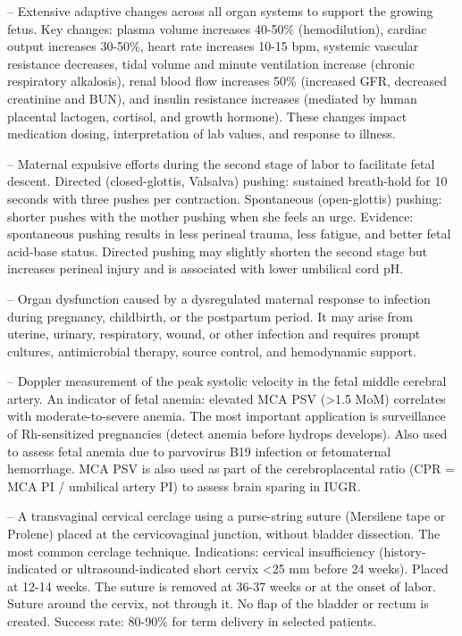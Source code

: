 -- Extensive adaptive changes across all organ systems to support the growing fetus. Key changes: plasma volume increases 40-50\% (hemodilution), cardiac output increases 30-50\%, heart rate increases 10-15 bpm, systemic vascular resistance decreases, tidal volume and minute ventilation increase (chronic respiratory alkalosis), renal blood flow increases 50\% (increased GFR, decreased creatinine and BUN), and insulin resistance increases (mediated by human placental lactogen, cortisol, and growth hormone). These changes impact medication dosing, interpretation of lab values, and response to illness.

-- Maternal expulsive efforts during the second stage of labor to facilitate fetal descent. Directed (closed-glottis, Valsalva) pushing: sustained breath-hold for 10 seconds with three pushes per contraction. Spontaneous (open-glottis) pushing: shorter pushes with the mother pushing when she feels an urge. Evidence: spontaneous pushing results in less perineal trauma, less fatigue, and better fetal acid-base status. Directed pushing may slightly shorten the second stage but increases perineal injury and is associated with lower umbilical cord pH.

-- Organ dysfunction caused by a dysregulated maternal response to infection during pregnancy, childbirth, or the postpartum period. It may arise from uterine, urinary, respiratory, wound, or other infection and requires prompt cultures, antimicrobial therapy, source control, and hemodynamic support.

-- Doppler measurement of the peak systolic velocity in the fetal middle cerebral artery. An indicator of fetal anemia: elevated MCA PSV (>1.5 MoM) correlates with moderate-to-severe anemia. The most important application is surveillance of Rh-sensitized pregnancies (detect anemia before hydrops develops). Also used to assess fetal anemia due to parvovirus B19 infection or fetomaternal hemorrhage. MCA PSV is also used as part of the cerebroplacental ratio (CPR = MCA PI / umbilical artery PI) to assess brain sparing in IUGR.

-- A transvaginal cervical cerclage using a purse-string suture (Mersilene tape or Prolene) placed at the cervicovaginal junction, without bladder dissection. The most common cerclage technique. Indications: cervical insufficiency (history-indicated or ultrasound-indicated short cervix <25 mm before 24 weeks). Placed at 12-14 weeks. The suture is removed at 36-37 weeks or at the onset of labor. Suture around the cervix, not through it. No flap of the bladder or rectum is created. Success rate: 80-90\% for term delivery in selected patients.

